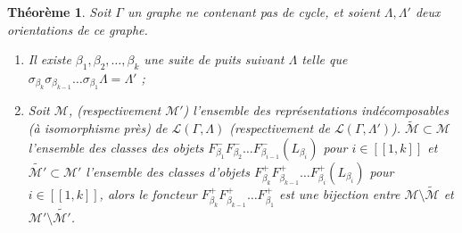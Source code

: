 \documentclass[a4paper,11pt]{article}
\newtheorem{thm}{Théorème}[section]
\begin{document}
\begin{thm}
\label{thm2}
Soit $\Gamma$ un graphe ne contenant pas de cycle, et soient $\Lambda,\Lambda'$ deux orientations de ce graphe. 
\begin{enumerate}
\item Il existe $\beta_1,\beta_2,\dots,\beta_k$ une suite de puits suivant $\Lambda$ telle que $\sigma_{\beta_k}\sigma_{\beta_{k-1}}\dots\sigma_{\beta_1}\Lambda=\Lambda'$ ;
\item Soit $\mathscr M$, (respectivement $\mathscr M'$) l'ensemble des représentations indécomposables (à isomorphisme près) de $\mathscr L(\Gamma,\Lambda)$ (respectivement de $\mathscr L(\Gamma,\Lambda')$). $\widetilde{ \mathscr M} \subset \mathscr M$ l'ensemble des classes des objets $F^{-}_{\beta_{1}}F^{-}_{\beta_{2}} \dots F^{-}_{\beta_{i-1}}(L_{\beta_{i}})$ pour $i\in [\![1,k]\!]$ et $\widetilde{ \mathscr M'} \subset \mathscr M' $ l'ensemble des classes d'objets $F^{+}_{\beta_{k}}F^{+}_{\beta_{k-1}} \dots F^{+}_{\beta_{i}}(L_{\beta_{i}})$ pour $i \in [\![1,k]\!]$, alors le foncteur $F^{+}_{\beta_{k}}F^{+}_{\beta_{k-1}} \dots F^{+}_{\beta_{1}}$ est une bijection entre $\mathscr{ M} \setminus \widetilde{\mathscr M}$ et $\mathscr{ M}' \setminus \widetilde{\mathscr{M}'}$.
\end{enumerate}
\end{thm}
\end{document}
